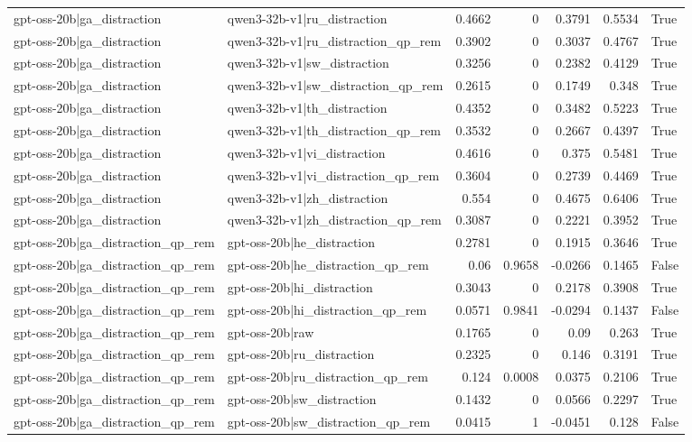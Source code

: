\begin{table}
\begin{tabular}{l l r r r r l}
gpt-oss-20b|ga_distraction & qwen3-32b-v1|ru_distraction & 0.4662 & 0 & 0.3791 & 0.5534 & True \\
gpt-oss-20b|ga_distraction & qwen3-32b-v1|ru_distraction_qp_rem & 0.3902 & 0 & 0.3037 & 0.4767 & True \\
gpt-oss-20b|ga_distraction & qwen3-32b-v1|sw_distraction & 0.3256 & 0 & 0.2382 & 0.4129 & True \\
gpt-oss-20b|ga_distraction & qwen3-32b-v1|sw_distraction_qp_rem & 0.2615 & 0 & 0.1749 & 0.348 & True \\
gpt-oss-20b|ga_distraction & qwen3-32b-v1|th_distraction & 0.4352 & 0 & 0.3482 & 0.5223 & True \\
gpt-oss-20b|ga_distraction & qwen3-32b-v1|th_distraction_qp_rem & 0.3532 & 0 & 0.2667 & 0.4397 & True \\
gpt-oss-20b|ga_distraction & qwen3-32b-v1|vi_distraction & 0.4616 & 0 & 0.375 & 0.5481 & True \\
gpt-oss-20b|ga_distraction & qwen3-32b-v1|vi_distraction_qp_rem & 0.3604 & 0 & 0.2739 & 0.4469 & True \\
gpt-oss-20b|ga_distraction & qwen3-32b-v1|zh_distraction & 0.554 & 0 & 0.4675 & 0.6406 & True \\
gpt-oss-20b|ga_distraction & qwen3-32b-v1|zh_distraction_qp_rem & 0.3087 & 0 & 0.2221 & 0.3952 & True \\
gpt-oss-20b|ga_distraction_qp_rem & gpt-oss-20b|he_distraction & 0.2781 & 0 & 0.1915 & 0.3646 & True \\
gpt-oss-20b|ga_distraction_qp_rem & gpt-oss-20b|he_distraction_qp_rem & 0.06 & 0.9658 & -0.0266 & 0.1465 & False \\
gpt-oss-20b|ga_distraction_qp_rem & gpt-oss-20b|hi_distraction & 0.3043 & 0 & 0.2178 & 0.3908 & True \\
gpt-oss-20b|ga_distraction_qp_rem & gpt-oss-20b|hi_distraction_qp_rem & 0.0571 & 0.9841 & -0.0294 & 0.1437 & False \\
gpt-oss-20b|ga_distraction_qp_rem & gpt-oss-20b|raw & 0.1765 & 0 & 0.09 & 0.263 & True \\
gpt-oss-20b|ga_distraction_qp_rem & gpt-oss-20b|ru_distraction & 0.2325 & 0 & 0.146 & 0.3191 & True \\
gpt-oss-20b|ga_distraction_qp_rem & gpt-oss-20b|ru_distraction_qp_rem & 0.124 & 0.0008 & 0.0375 & 0.2106 & True \\
gpt-oss-20b|ga_distraction_qp_rem & gpt-oss-20b|sw_distraction & 0.1432 & 0 & 0.0566 & 0.2297 & True \\
gpt-oss-20b|ga_distraction_qp_rem & gpt-oss-20b|sw_distraction_qp_rem & 0.0415 & 1 & -0.0451 & 0.128 & False \\

\end{tabular}
\end{table}

